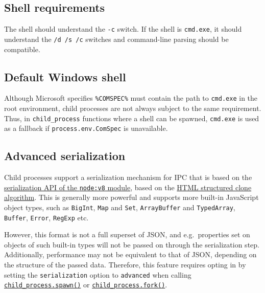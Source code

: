 \subsection{Shell requirements}\label{shell-requirements}

The shell should understand the \texttt{-c} switch. If the shell is
\texttt{\textquotesingle{}cmd.exe\textquotesingle{}}, it should
understand the \texttt{/d\ /s\ /c} switches and command-line parsing
should be compatible.

\subsection{Default Windows shell}\label{default-windows-shell}

Although Microsoft specifies \texttt{\%COMSPEC\%} must contain the path
to \texttt{\textquotesingle{}cmd.exe\textquotesingle{}} in the root
environment, child processes are not always subject to the same
requirement. Thus, in \texttt{child\_process} functions where a shell
can be spawned, \texttt{\textquotesingle{}cmd.exe\textquotesingle{}} is
used as a fallback if \texttt{process.env.ComSpec} is unavailable.

\subsection{Advanced serialization}\label{advanced-serialization}

Child processes support a serialization mechanism for IPC that is based
on the \href{v8.md\#serialization-api}{serialization API of the
\texttt{node:v8} module}, based on the
\href{https://developer.mozilla.org/en-US/docs/Web/API/Web_Workers_API/Structured_clone_algorithm}{HTML
structured clone algorithm}. This is generally more powerful and
supports more built-in JavaScript object types, such as \texttt{BigInt},
\texttt{Map} and \texttt{Set}, \texttt{ArrayBuffer} and
\texttt{TypedArray}, \texttt{Buffer}, \texttt{Error}, \texttt{RegExp}
etc.

However, this format is not a full superset of JSON, and e.g.~properties
set on objects of such built-in types will not be passed on through the
serialization step. Additionally, performance may not be equivalent to
that of JSON, depending on the structure of the passed data. Therefore,
this feature requires opting in by setting the \texttt{serialization}
option to \texttt{\textquotesingle{}advanced\textquotesingle{}} when
calling
\hyperref[child_processspawncommand-args-options]{\texttt{child\_process.spawn()}}
or
\hyperref[child_processforkmodulepath-args-options]{\texttt{child\_process.fork()}}.
